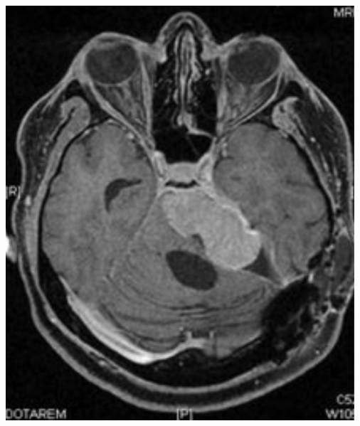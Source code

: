 \documentclass{beamer}
\begin{document}
\begin{frame}
\begin{columns}
\begin{column}{0.5\textwidth}
        \includegraphics[width=\textwidth]{figures/AKDemetriades_Fig4C.png}
        \end{column}
    \end{columns}
\end{frame}
\end{document}

